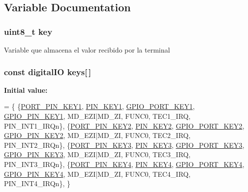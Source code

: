 \subsection{Variable Documentation}
\subsubsection[{\texorpdfstring{key}{key}}]{\setlength{\rightskip}{0pt plus 5cm}uint8\+\_\+t key}\hypertarget{group__operaciones_ga3496dfc7a27df7eead65d48ed89e6867}{}\label{group__operaciones_ga3496dfc7a27df7eead65d48ed89e6867}
Variable que almacena el valor recibido por la terminal 
\subsubsection[{\texorpdfstring{keys}{keys}}]{\setlength{\rightskip}{0pt plus 5cm}const {\bf digital\+IO} keys\mbox{[}$\,$\mbox{]}}\hypertarget{group__operaciones_ga827b5290b185d584f07107e0190dd6d2}{}\label{group__operaciones_ga827b5290b185d584f07107e0190dd6d2}
{\bfseries Initial value\+:}
\begin{DoxyCode}
=
\{
        \{\hyperlink{group__hardware_gafe1bf3da61040955deda9703ee539687}{PORT\_PIN\_KEY1}, \hyperlink{group__hardware_ga332cf72d49bf86b7b20274f3dec99d7b}{PIN\_KEY1}, \hyperlink{group__hardware_gabce59bc33538c850842e408765ae4981}{GPIO\_PORT\_KEY1}, 
      \hyperlink{group__hardware_ga26fa1a6916e027dcfa2d5a76c18dccb4}{GPIO\_PIN\_KEY1}, MD\_EZI|MD\_ZI, FUNC0, TEC1\_IRQ, PIN\_INT1\_IRQn\},
        \{\hyperlink{group__hardware_ga2cc4114181749a25732e31ed271a1f6b}{PORT\_PIN\_KEY2}, \hyperlink{group__hardware_gae87128e49906c97fa9d6b438a08c1221}{PIN\_KEY2}, \hyperlink{group__hardware_gaeaf62bdfcf5fc1fe75d98d961286be78}{GPIO\_PORT\_KEY2}, 
      \hyperlink{group__hardware_ga6fe528c749e6e3df18c66c78841fd2ae}{GPIO\_PIN\_KEY2}, MD\_EZI|MD\_ZI, FUNC0, TEC2\_IRQ, PIN\_INT2\_IRQn\},
        \{\hyperlink{group__hardware_ga5f697895be4580f403de4a9f75ab8a3b}{PORT\_PIN\_KEY3}, \hyperlink{group__hardware_gaec621d9712815696a7bd342db8b2ff06}{PIN\_KEY3}, \hyperlink{group__hardware_ga6e75308c8b20c3236d0449a07bb052f7}{GPIO\_PORT\_KEY3}, 
      \hyperlink{group__hardware_ga6058161cd4273d1df2af95589e043055}{GPIO\_PIN\_KEY3}, MD\_EZI|MD\_ZI, FUNC0, TEC3\_IRQ, PIN\_INT3\_IRQn\},
        \{\hyperlink{group__hardware_gac86eb82e082d51cc0d4b0a87680cd7da}{PORT\_PIN\_KEY4}, \hyperlink{group__hardware_gaf59a027359301b6e2229f7068c36efe6}{PIN\_KEY4}, \hyperlink{group__hardware_ga6d16f3a208324c46c462f92ad249d199}{GPIO\_PORT\_KEY4}, 
      \hyperlink{group__hardware_gabeaec154a7007cd91de9a8c775f4242f}{GPIO\_PIN\_KEY4}, MD\_EZI|MD\_ZI, FUNC0, TEC4\_IRQ, PIN\_INT4\_IRQn\},
\}
\end{DoxyCode}


